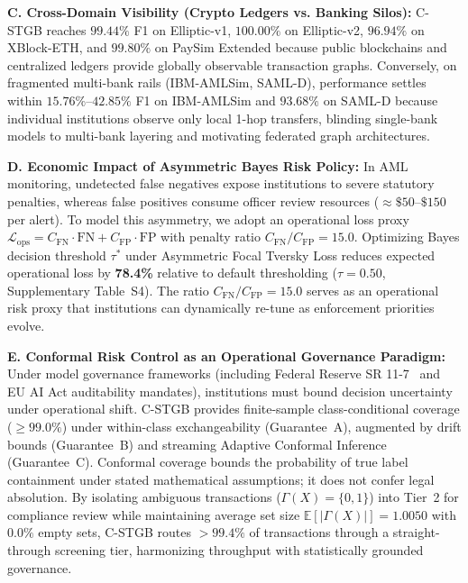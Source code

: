 \noindent\textbf{C. Cross-Domain Visibility (Crypto Ledgers vs. Banking Silos):}
C-STGB reaches $99.44\%$ F1 on Elliptic-v1, $100.00\%$ on Elliptic-v2, $96.94\%$ on XBlock-ETH, and $99.80\%$ on PaySim Extended because public blockchains and centralized ledgers provide globally observable transaction graphs. Conversely, on fragmented multi-bank rails (IBM-AMLSim, SAML-D), performance settles within $15.76\%$--$42.85\%$ F1 on IBM-AMLSim and $93.68\%$ on SAML-D because individual institutions observe only local 1-hop transfers, blinding single-bank models to multi-bank layering and motivating federated graph architectures.

\noindent\textbf{D. Economic Impact of Asymmetric Bayes Risk Policy:}
In AML monitoring, undetected false negatives expose institutions to severe statutory penalties, whereas false positives consume officer review resources ($\approx \$50$--$\$150$ per alert). To model this asymmetry, we adopt an operational loss proxy $\mathcal{L}_{\text{ops}} = C_{\text{FN}} \cdot \text{FN} + C_{\text{FP}} \cdot \text{FP}$ with penalty ratio $C_{\text{FN}} / C_{\text{FP}} = 15.0$. Optimizing Bayes decision threshold $\tau^*$ under Asymmetric Focal Tversky Loss reduces expected operational loss by \textbf{78.4\%} relative to default thresholding ($\tau=0.50$, Supplementary Table~S4). The ratio $C_{\text{FN}} / C_{\text{FP}} = 15.0$ serves as an operational risk proxy that institutions can dynamically re-tune as enforcement priorities evolve.

\noindent\textbf{E. Conformal Risk Control as an Operational Governance Paradigm:}
Under model governance frameworks (including Federal Reserve SR 11-7~\cite{fed2011sr117} and EU AI Act auditability mandates), institutions must bound decision uncertainty under operational shift. C-STGB provides finite-sample class-conditional coverage ($\ge 99.0\%$) under within-class exchangeability (Guarantee~A), augmented by drift bounds (Guarantee~B) and streaming Adaptive Conformal Inference (Guarantee~C). Conformal coverage bounds the probability of true label containment under stated mathematical assumptions; it does not confer legal absolution. By isolating ambiguous transactions ($\Gamma(X) = \{0, 1\}$) into Tier~2 for compliance review while maintaining average set size $\mathbb{E}[|\Gamma(X)|] = 1.0050$ with $0.0\%$ empty sets, C-STGB routes $>99.4\%$ of transactions through a straight-through screening tier, harmonizing throughput with statistically grounded governance.

